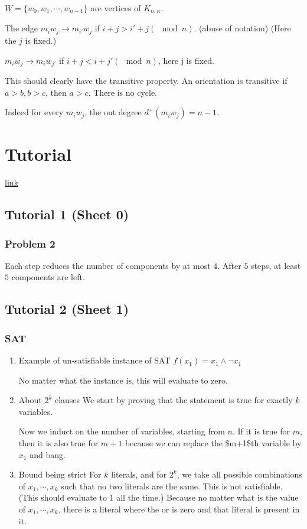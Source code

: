 \documentclass[11pt]{article}
\begin{document}
\(W = \{w_0, w_1, \cdots, w_{n-1}\}\) are vertices of \(K_{n,n}\).

The edge \(m_iw_j \rightarrow m_{i'}w_j\) if \(i+j > i' + j (\mod n)\). (abuse of
notation) (Here the \(j\) is fixed.)

\(m_i w_j \rightarrow m_i w_{j'}\) if \(i + j < i + j' (\mod n)\), here j is
fixed.

This should clearly have the transitive property. An orientation is
transitive if \(a > b, b > c\), then \(a > c\). There is no cycle.

Indeed for every \(m_i w_j\), the out degree \(d^{+}(m_iw_j) = n-1\).   
\section{Tutorial}
\label{sec:org2a9b340}
\href{http://discretemath.imp.fu-berlin.de/DMII-2018-19/}{link}
\subsection{Tutorial 1 (Sheet 0)}
\label{sec:org0d99fa5}
\subsubsection{Problem 2}
\label{sec:org5fd4ded}
Each step reduces the number of components by at most \(4\). After \(5\) steps, at least \(5\) components are left. 
\subsection{Tutorial 2 (Sheet 1)}
\label{sec:org24c27ac}
\subsubsection{SAT}
\label{sec:org4cea3ea}
\begin{enumerate}
\item Example of un-satisfiable instance of SAT
\label{sec:orgd8b5727}
\(f(x_1) = x_1 \wedge \neg x_1\)

No matter what the instance is, this will evaluate to zero. 
\item About \(2^k\) clauses
\label{sec:org03fc2ea}
We start by proving that the statement is true for exactly \(k\) variables. 

Now we induct on the number of variables, starting from \(n\). If it is true
for \(m\), then it is also true for \(m+1\) because we can replace the \$m+1\$th
variable by \(x_1\) and bang.
\item Bound being strict
\label{sec:org4f24461}
For \(k\) literals, and for \(2^k\), we take all possible combinations of \(x_1,
     \cdots, x_k\) such that no two literals are the same. This is not
satisfiable. (This should evaluate to \(1\) all the time.) Because no matter
what is the value of \(x_1, \cdots, x_k\), there is a literal where the or is
zero and that literal is present in it.
\end{enumerate}
\end{document}
